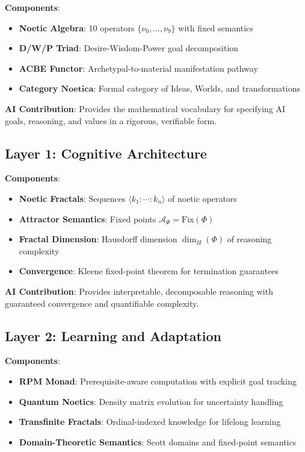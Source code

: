 \documentclass[11pt,twoside]{article}
\theoremstyle{definition}
\theoremstyle{plain}
\theoremstyle{remark}
\newcommand{\Noetica}{\mathbf{Noetica}}
\newcommand{\noe}[1]{\nu_{#1}}
\newcommand{\Frac}{\Phi}
\newcommand{\FractalAttractor}{\mathcal{A}_\Phi}
\begin{document}
\textbf{Components}:
\begin{itemize}
  \item \textbf{Noetic Algebra}: 10 operators $\{\noe{0}, \ldots, \noe{9}\}$ with fixed semantics
  \item \textbf{D/W/P Triad}: Desire-Wisdom-Power goal decomposition
  \item \textbf{ACBE Functor}: Archetypal-to-material manifestation pathway
  \item \textbf{Category $\Noetica$}: Formal category of Ideas, Worlds, and transformations
\end{itemize}

\textbf{AI Contribution}: Provides the mathematical vocabulary for specifying AI goals,
reasoning, and values in a rigorous, verifiable form.

\subsection{Layer 1: Cognitive Architecture}

\textbf{Components}:
\begin{itemize}
  \item \textbf{Noetic Fractals}: Sequences $\langle k_1 : \cdots : k_n \rangle$ of noetic operators
  \item \textbf{Attractor Semantics}: Fixed points $\FractalAttractor = \mathrm{Fix}(\Frac)$
  \item \textbf{Fractal Dimension}: Hausdorff dimension $\dim_H(\Frac)$ of reasoning complexity
  \item \textbf{Convergence}: Kleene fixed-point theorem for termination guarantees
\end{itemize}

\textbf{AI Contribution}: Provides interpretable, decomposable reasoning with guaranteed
convergence and quantifiable complexity.

\subsection{Layer 2: Learning and Adaptation}

\textbf{Components}:
\begin{itemize}
  \item \textbf{RPM Monad}: Prerequisite-aware computation with explicit goal tracking
  \item \textbf{Quantum Noetics}: Density matrix evolution for uncertainty handling
  \item \textbf{Transfinite Fractals}: Ordinal-indexed knowledge for lifelong learning
  \item \textbf{Domain-Theoretic Semantics}: Scott domains and fixed-point semantics
\end{itemize}
\end{document}
